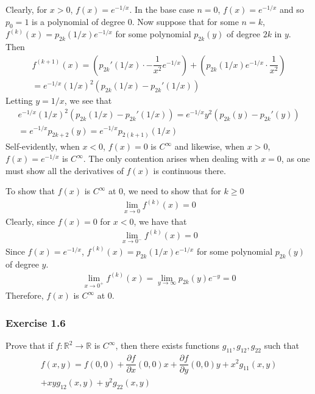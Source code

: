 \documentclass{article}
\newcommand{\R}{\mathbb{R}}
\begin{document}
	Clearly, for $x > 0$, $f(x) = e^{-1/x}$. In the base case $n = 0$, $f(x) = e^{-1/x}$ and so $p_0 = 1$ is a polynomial of degree 0. Now suppose that for some $n = k$, $f^{(k)}(x) = p_{2k}(1/x)e^{-1/x}$ for some polynomial $p_{2k}(y)$ of degree $2k$ in $y$. Then
	\begin{gather*}
		f^{(k + 1)}(x) = \left( p_{2k}'(1/x) \cdot -\dfrac{1}{x^2} e^{-1/x} \right) + \left( p_{2k}(1/x)e^{-1/x} \cdot \dfrac{1}{x^2} \right) \\
		= e^{-1/x} \left( 1 / x \right)^2 \left( p_{2k}(1/x) - p_{2k}'(1/x) \right)
	\end{gather*}
	Letting $y = 1/x$, we see that
	\begin{gather*}
		e^{-1/x} \left( 1 / x \right)^2 \left( p_{2k}(1/x) - p_{2k}'(1/x) \right) = e^{-1/x} y^2 \left( p_{2k}(y) - p_{2k}'(y) \right) \\
		= e^{-1/x} p_{2k + 2}(y) = e^{-1/x} p_{2(k + 1)}(1/x)
	\end{gather*}
	Self-evidently, when $x < 0$, $f(x) = 0$ is $C^{\infty}$ and likewise, when $x > 0$, $f(x) = e^{-1/x}$ is $C^{\infty}$. The only contention arises when dealing with $x = 0$, as one must show all the derivatives of $f(x)$ is continuous there.
	
	To show that $f(x)$ is $C^{\infty}$ at 0, we need to show that for $k \geq 0$
	\begin{gather*}
		\lim_{x \to 0} f^{(k)}(x) = 0
	\end{gather*}
	Clearly, since $f(x) = 0$ for $x < 0$, we have that
	\begin{gather*}
		\lim_{x \to 0^-} f^{(k)}(x) = 0
	\end{gather*}
	Since $f(x) = e^{-1/x}$, $f^{(k)}(x) = p_{2k}(1/x)e^{-1/x}$ for some polynomial $p_{2k}(y)$ of degree $y$.
	\begin{gather*}
		\lim_{x \to 0^+} f^{(k)}(x) = \lim_{y \to \infty} p_{2k}(y)e^{-y} = 0
	\end{gather*}
	Therefore, $f(x)$ is $C^{\infty}$ at 0.

	\subsubsection*{Exercise 1.6}
	Prove that if $f: \R^2 \to \R$ is $C^{\infty}$, then there exists functions $g_{11}, g_{12}, g_{22}$ such that
	\begin{gather*}
		f(x, y) = f(0, 0) + \dfrac{\partial f}{\partial x}(0, 0)x + \dfrac{\partial f}{\partial y}(0, 0)y + x^2 g_{11}(x, y) \\
		+ xy g_{12}(x, y) + y^2 g_{22}(x, y)
	\end{gather*}
	
\end{document}
